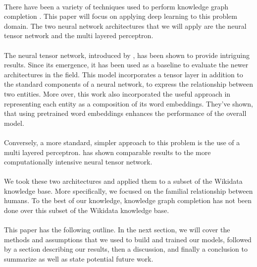 \documentclass[11.5pt]{article}
\begin{document}
\paragraph{} There have been a variety of techniques used to perform knowledge graph completion \cite{nickel2016review}. This paper will focus on applying deep learning to this problem domain. The two neural network architectures that we will apply are the neural tensor network and the multi layered perceptron. 

\paragraph{} The neural tensor network, introduced by \cite{socher2013reasoning}, has been shown to provide intriguing results. Since its emergence, it has been used as a baseline to evaluate the newer architectures in the field. This model incorporates a tensor layer in addition to the standard components of a neural network, to express the relationship between two entities. More over, this work also incorporated the useful approach in representing each entity as a composition of its word embeddings. They've shown, that using pretrained word embeddings enhances the performance of the overall model.

\paragraph{}Conversely, a more standard, simpler approach to this problem is the use of a multi layered perceptron. \cite{dong2014knowledge} has shown comparable results to the more computationally intensive neural tensor network.

\paragraph{}We took these two architectures and applied them to a subset of the Wikidata knowledge base. More specifically, we focused on the familial relationship between humans. To the best of our knowledge, knowledge graph completion has not been done over this subset of the Wikidata knowledge base.

\paragraph{}This paper has the following outline. In the next section, we will cover the methods and assumptions that we used to build and trained our models, followed by a section describing our results, then a discussion, and finally a conclusion to summarize as well as state potential future work.
\end{document}
